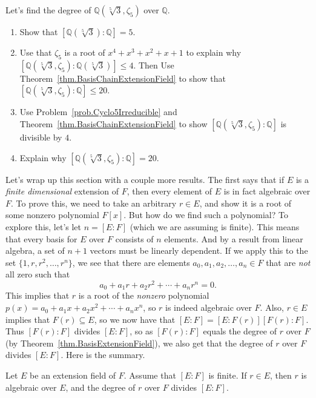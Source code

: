 
\begin{problem}\label{prob.DegreeQFifthRoot3AndZeta5}
Let's find the degree of $\mathbb{Q}(\sqrt[5]{3},\zeta_5)$ over $\mathbb{Q}$.
\begin{enumerate}
\item Show that $[\mathbb{Q}(\sqrt[5]{3}):\mathbb{Q}] = 5$.
\item Use that $\zeta_5$ is a root of $x^4+x^3+x^2+x+1$ to explain why $[\mathbb{Q}(\sqrt[5]{3},\zeta_5):\mathbb{Q}(\sqrt[5]{3})] \le 4$. Then Use Theorem~\ref{thm.BasisChainExtensionField} to show that $[\mathbb{Q}(\sqrt[5]{3},\zeta_5):\mathbb{Q}]\le 20$.
\item Use Problem~\ref{prob.Cyclo5Irreducible} and Theorem~\ref{thm.BasisChainExtensionField}  to show $[\mathbb{Q}(\sqrt[5]{3},\zeta_5):\mathbb{Q}]$ is divisible by $4$.
\item Explain why $[\mathbb{Q}(\sqrt[5]{3},\zeta_5):\mathbb{Q}]= 20.$
\end{enumerate}
\end{problem}

Let's wrap up this section with a couple more results. The first says that if $E$ is a \emph{finite dimensional} extension of $F$, then every element of $E$ is in fact algebraic over $F$. To prove this, we need to take an arbitrary $r\in E$, and show it is a root of some nonzero polynomial $F[x]$. But how do we find such a polynomial? To explore this, let's let $n= [E:F]$ (which we are assuming is finite). This means that every basis for $E$ over $F$ consists of $n$ elements. And by a result from  linear algebra, a set of $n+1$ vectors must be linearly dependent. If we apply this to the set $\{1,r,r^2,\ldots,r^n\}$, we see that there are elements $a_0,a_1,a_2,\ldots,a_n\in F$ that are \emph{not} all zero such that \[a_0+a_1r+a_2r^2+\cdots+a_nr^n = 0.\]
This implies that $r$ is a root of the \emph{nonzero} polynomial $p(x) = a_0+a_1x+a_2x^2+\cdots+a_nx^n$, so $r$ is indeed algebraic over $F$. Also, $r\in E$ implies that $F(r)\subseteq E$, so we now have that $[E:F] = [E:F(r)][F(r):F]$. Thus $[F(r):F]$ divides $[E:F]$, so as $[F(r):F]$ equals the degree of $r$ over $F$ (by Theorem~\ref{thm.BasisExtensionField}), we also get that the degree of $r$ over $F$ divides $[E:F]$. Here is the summary.

\begin{fact}
Let $E$ be an extension field of $F$. Assume that $[E:F]$ is finite. If $r\in E$, then $r$ is algebraic over $E$, and the degree of $r$ over $F$ divides $[E:F]$.
\end{fact}


